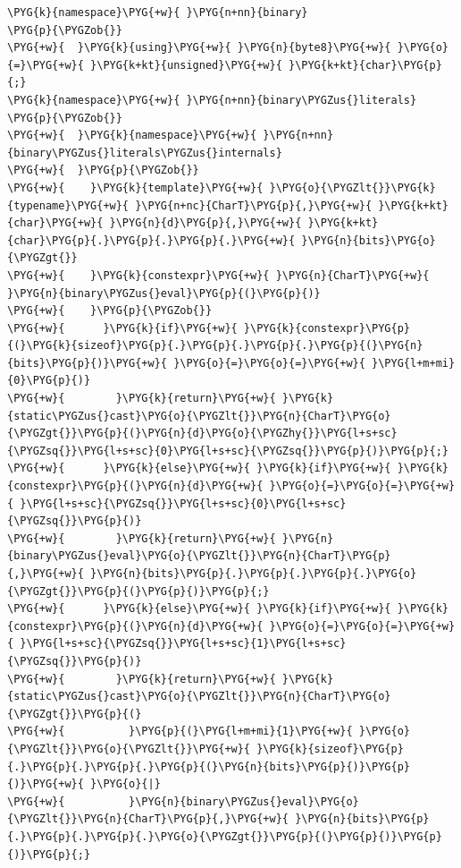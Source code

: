 \begin{itemize}
\begin{codeblockbg}
\begin{Verbatim}[commandchars=\\\{\},breaklines=true,breakanywhere=true,fontsize=\codefont,xleftmargin=17bp]
\PYG{k}{namespace}\PYG{+w}{ }\PYG{n+nn}{binary}
\PYG{p}{\PYGZob{}}
\PYG{+w}{  }\PYG{k}{using}\PYG{+w}{ }\PYG{n}{byte8}\PYG{+w}{ }\PYG{o}{=}\PYG{+w}{ }\PYG{k+kt}{unsigned}\PYG{+w}{ }\PYG{k+kt}{char}\PYG{p}{;}
\PYG{k}{namespace}\PYG{+w}{ }\PYG{n+nn}{binary\PYGZus{}literals}
\PYG{p}{\PYGZob{}}
\PYG{+w}{  }\PYG{k}{namespace}\PYG{+w}{ }\PYG{n+nn}{binary\PYGZus{}literals\PYGZus{}internals}
\PYG{+w}{  }\PYG{p}{\PYGZob{}}
\PYG{+w}{    }\PYG{k}{template}\PYG{+w}{ }\PYG{o}{\PYGZlt{}}\PYG{k}{typename}\PYG{+w}{ }\PYG{n+nc}{CharT}\PYG{p}{,}\PYG{+w}{ }\PYG{k+kt}{char}\PYG{+w}{ }\PYG{n}{d}\PYG{p}{,}\PYG{+w}{ }\PYG{k+kt}{char}\PYG{p}{.}\PYG{p}{.}\PYG{p}{.}\PYG{+w}{ }\PYG{n}{bits}\PYG{o}{\PYGZgt{}}
\PYG{+w}{    }\PYG{k}{constexpr}\PYG{+w}{ }\PYG{n}{CharT}\PYG{+w}{ }\PYG{n}{binary\PYGZus{}eval}\PYG{p}{(}\PYG{p}{)}
\PYG{+w}{    }\PYG{p}{\PYGZob{}}
\PYG{+w}{      }\PYG{k}{if}\PYG{+w}{ }\PYG{k}{constexpr}\PYG{p}{(}\PYG{k}{sizeof}\PYG{p}{.}\PYG{p}{.}\PYG{p}{.}\PYG{p}{(}\PYG{n}{bits}\PYG{p}{)}\PYG{+w}{ }\PYG{o}{=}\PYG{o}{=}\PYG{+w}{ }\PYG{l+m+mi}{0}\PYG{p}{)}
\PYG{+w}{        }\PYG{k}{return}\PYG{+w}{ }\PYG{k}{static\PYGZus{}cast}\PYG{o}{\PYGZlt{}}\PYG{n}{CharT}\PYG{o}{\PYGZgt{}}\PYG{p}{(}\PYG{n}{d}\PYG{o}{\PYGZhy{}}\PYG{l+s+sc}{\PYGZsq{}}\PYG{l+s+sc}{0}\PYG{l+s+sc}{\PYGZsq{}}\PYG{p}{)}\PYG{p}{;}
\PYG{+w}{      }\PYG{k}{else}\PYG{+w}{ }\PYG{k}{if}\PYG{+w}{ }\PYG{k}{constexpr}\PYG{p}{(}\PYG{n}{d}\PYG{+w}{ }\PYG{o}{=}\PYG{o}{=}\PYG{+w}{ }\PYG{l+s+sc}{\PYGZsq{}}\PYG{l+s+sc}{0}\PYG{l+s+sc}{\PYGZsq{}}\PYG{p}{)}
\PYG{+w}{        }\PYG{k}{return}\PYG{+w}{ }\PYG{n}{binary\PYGZus{}eval}\PYG{o}{\PYGZlt{}}\PYG{n}{CharT}\PYG{p}{,}\PYG{+w}{ }\PYG{n}{bits}\PYG{p}{.}\PYG{p}{.}\PYG{p}{.}\PYG{o}{\PYGZgt{}}\PYG{p}{(}\PYG{p}{)}\PYG{p}{;}
\PYG{+w}{      }\PYG{k}{else}\PYG{+w}{ }\PYG{k}{if}\PYG{+w}{ }\PYG{k}{constexpr}\PYG{p}{(}\PYG{n}{d}\PYG{+w}{ }\PYG{o}{=}\PYG{o}{=}\PYG{+w}{ }\PYG{l+s+sc}{\PYGZsq{}}\PYG{l+s+sc}{1}\PYG{l+s+sc}{\PYGZsq{}}\PYG{p}{)}
\PYG{+w}{        }\PYG{k}{return}\PYG{+w}{ }\PYG{k}{static\PYGZus{}cast}\PYG{o}{\PYGZlt{}}\PYG{n}{CharT}\PYG{o}{\PYGZgt{}}\PYG{p}{(}
\PYG{+w}{          }\PYG{p}{(}\PYG{l+m+mi}{1}\PYG{+w}{ }\PYG{o}{\PYGZlt{}}\PYG{o}{\PYGZlt{}}\PYG{+w}{ }\PYG{k}{sizeof}\PYG{p}{.}\PYG{p}{.}\PYG{p}{.}\PYG{p}{(}\PYG{n}{bits}\PYG{p}{)}\PYG{p}{)}\PYG{+w}{ }\PYG{o}{|}
\PYG{+w}{          }\PYG{n}{binary\PYGZus{}eval}\PYG{o}{\PYGZlt{}}\PYG{n}{CharT}\PYG{p}{,}\PYG{+w}{ }\PYG{n}{bits}\PYG{p}{.}\PYG{p}{.}\PYG{p}{.}\PYG{o}{\PYGZgt{}}\PYG{p}{(}\PYG{p}{)}\PYG{p}{)}\PYG{p}{;}

\end{Verbatim}
\end{codeblockbg}
\end{itemize}
